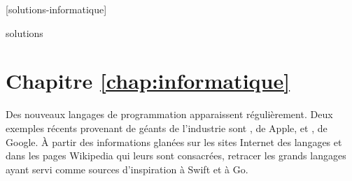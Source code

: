 [solutions-informatique]

\begin{Filesave}{solutions}
\section*{Chapitre \ref*{chap:informatique}}

\end{Filesave}

\begin{exercice}[nosol]
  Des nouveaux langages de programmation apparaissent régulièrement.
  Deux exemples récents provenant de géants de l'industrie sont
  , de Apple, et
  , de Google. À partir des informations
  glanées sur les sites Internet des langages et dans les pages
  Wikipedia qui leurs sont consacrées, retracer les grands langages
  ayant servi comme sources d'inspiration à Swift et à
  Go.
\end{exercice}

